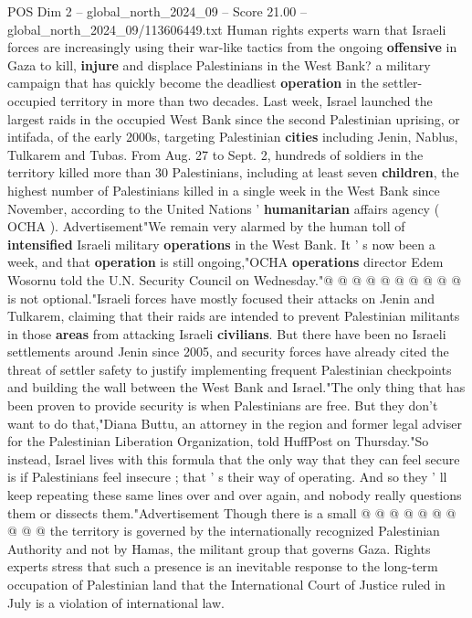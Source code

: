 \begin{textsample}{POS Dim 2 – global\_north\_2024\_09 – Score 21.00 – global\_north\_2024\_09/113606449.txt}  \label{ex:f2_pos_419}
Human rights experts warn that Israeli forces are increasingly using their war-like tactics from the ongoing \textbf{offensive} in Gaza to kill, \textbf{injure} and displace Palestinians in the West Bank? a military campaign that has quickly become the deadliest \textbf{operation} in the settler-occupied territory in more than two decades.
Last week, Israel launched the largest raids in the occupied West Bank since the second Palestinian uprising, or intifada, of the early 2000s, targeting Palestinian \textbf{cities} including Jenin, Nablus, Tulkarem and Tubas.
From Aug. 27 to Sept. 2, hundreds of soldiers in the territory killed more than 30 Palestinians, including at least seven \textbf{children}, the highest number of Palestinians killed in a single week in the West Bank since November, according to the United Nations ' \textbf{humanitarian} affairs agency ( OCHA ).
Advertisement"We remain very alarmed by the human toll of \textbf{intensified} Israeli military \textbf{operations} in the West Bank.
It ' s now been a week, and that \textbf{operation} is still ongoing,"OCHA \textbf{operations} director Edem Wosornu told the U.N.
Security Council on Wednesday."@ @ @ @ @ @ @ @ @ @ is not optional."Israeli forces have mostly focused their attacks on Jenin and Tulkarem, claiming that their raids are intended to prevent Palestinian militants in those \textbf{areas} from attacking Israeli \textbf{civilians}.
But there have been no Israeli settlements around Jenin since 2005, and security forces have already cited the threat of settler safety to justify implementing frequent Palestinian checkpoints and building the wall between the West Bank and Israel."The only thing that has been proven to provide security is when Palestinians are free.
But they don't want to do that,"Diana Buttu, an attorney in the region and former legal adviser for the Palestinian Liberation Organization, told HuffPost on Thursday."So instead, Israel lives with this formula that the only way that they can feel secure is if Palestinians feel insecure ; that ' s their way of operating.
And so they ' ll keep repeating these same lines over and over again, and nobody really questions them or dissects them."Advertisement Though there is a small @ @ @ @ @ @ @ @ @ @ the territory is governed by the internationally recognized Palestinian Authority and not by Hamas, the militant group that governs Gaza.
Rights experts stress that such a presence is an inevitable response to the long-term occupation of Palestinian land that the International Court of Justice ruled in July is a violation of international law.

\end{textsample}
